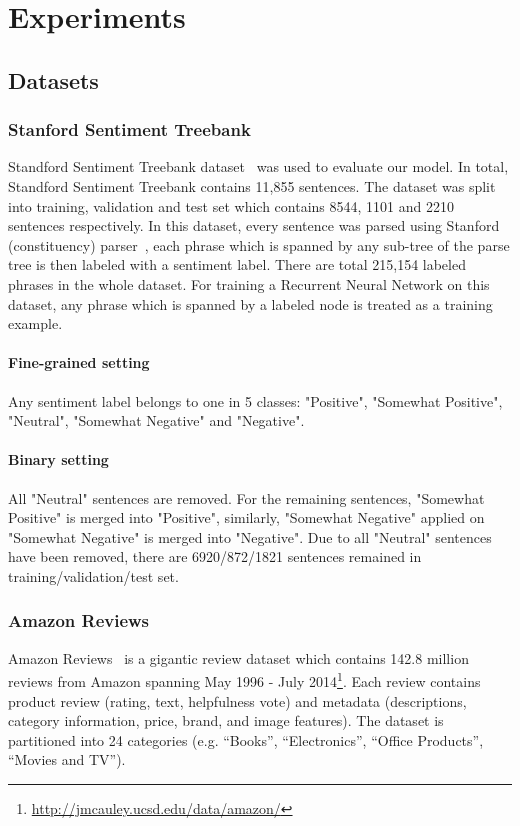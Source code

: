 \section{Experiments}
\subsection{Datasets}
\subsubsection{Stanford Sentiment Treebank} \label{sec:sst}
Standford Sentiment Treebank dataset~\cite{socher2013recursive} was used to evaluate our model.
In total, Standford Sentiment Treebank contains 11,855 sentences.
The dataset was split into training, validation and test set which contains 8544, 1101 and 2210 sentences respectively.
In this dataset, every sentence was parsed using Stanford (constituency) parser~\cite{socher2013recursive}, each phrase which is spanned by any sub-tree of the parse tree is then labeled with  a sentiment label.
There are total 215,154 labeled phrases in the whole dataset.
For training a Recurrent Neural Network on this dataset, any phrase which is spanned by a labeled node is treated as a training example. 
\paragraph{Fine-grained setting} Any sentiment label belongs to one in 5 classes: "Positive", "Somewhat Positive", "Neutral", "Somewhat Negative" and "Negative".
\paragraph{Binary setting} All "Neutral" sentences are removed.
For the remaining sentences, "Somewhat Positive" is merged into "Positive", similarly, "Somewhat Negative" applied on "Somewhat Negative" is merged into "Negative".
Due to all "Neutral" sentences have been removed, there are 6920/872/1821 sentences remained in training/validation/test set.
\subsubsection{Amazon Reviews}\label{sec:amazon}
Amazon Reviews~\cite{amazon-reviews} is a gigantic review dataset
which contains 142.8 million reviews from Amazon spanning May 1996 - July 2014\footnote{\url{http://jmcauley.ucsd.edu/data/amazon/}}.
Each review contains product review (rating, text, helpfulness vote) and metadata (descriptions, category information, price, brand, and image features).
The dataset is partitioned into 24 categories (e.g. ``Books'', ``Electronics'', ``Office Products'', ``Movies and TV'').
